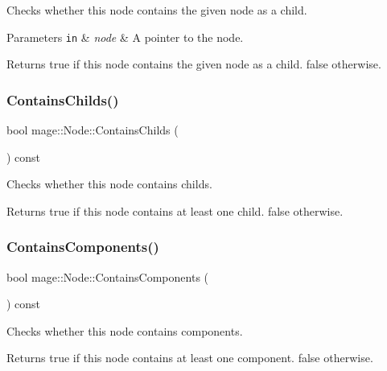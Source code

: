 Checks whether this node contains the given node as a child.


\begin{DoxyParams}[1]{Parameters}
\mbox{\tt in}  & {\em node} & A pointer to the node. \\
\hline
\end{DoxyParams}
\begin{DoxyReturn}{Returns}
{\ttfamily true} if this node contains the given node as a child. {\ttfamily false} otherwise. 
\end{DoxyReturn}
\hypertarget{classmage_1_1_node_afd885043a9de1b0c09d1eb0ef7bf6006}{}\label{classmage_1_1_node_afd885043a9de1b0c09d1eb0ef7bf6006} 
\subsubsection{\texorpdfstring{Contains\+Childs()}{ContainsChilds()}}
{\footnotesize\ttfamily bool mage\+::\+Node\+::\+Contains\+Childs (\begin{DoxyParamCaption}{ }\end{DoxyParamCaption}) const}

Checks whether this node contains childs.

\begin{DoxyReturn}{Returns}
{\ttfamily true} if this node contains at least one child. {\ttfamily false} otherwise. 
\end{DoxyReturn}
\hypertarget{classmage_1_1_node_aafb492896751b5b60ba5ddaeecbdd719}{}\label{classmage_1_1_node_aafb492896751b5b60ba5ddaeecbdd719} 
\subsubsection{\texorpdfstring{Contains\+Components()}{ContainsComponents()}}
{\footnotesize\ttfamily bool mage\+::\+Node\+::\+Contains\+Components (\begin{DoxyParamCaption}{ }\end{DoxyParamCaption}) const\hspace{0.3cm}{\ttfamily [noexcept]}}

Checks whether this node contains components.

\begin{DoxyReturn}{Returns}
{\ttfamily true} if this node contains at least one component. {\ttfamily false} otherwise. 
\end{DoxyReturn}
\hypertarget{classmage_1_1_node_a5ec6963ed4eb9d0463e220a53555d27a}{}\label{classmage_1_1_node_a5ec6963ed4eb9d0463e220a53555d27a} 

